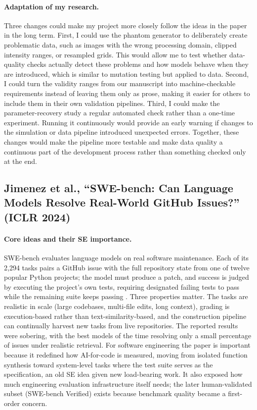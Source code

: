 \documentclass[11pt,a4paper]{article}
\begin{document}
\paragraph{Adaptation of my research.}
Three changes could make my project more closely follow the ideas in the paper in the long term. First, I could use the phantom generator to deliberately create problematic data, such as images with the wrong processing domain, clipped intensity ranges, or resampled grids. This would allow me to test whether data-quality checks actually detect these problems and how models behave when they are introduced, which is similar to mutation testing but applied to data. Second, I could turn the validity ranges from our manuscript into machine-checkable requirements instead of leaving them only as prose, making it easier for others to include them in their own validation pipelines. Third, I could make the parameter-recovery study a regular automated check rather than a one-time experiment. Running it continuously would provide an early warning if changes to the simulation or data pipeline introduced unexpected errors. Together, these changes would make the pipeline more testable and make data quality a continuous part of the development process rather than something checked only at the end.

\subsection{Jimenez et al., ``SWE-bench: Can Language Models Resolve Real-World GitHub Issues?'' (ICLR 2024)}

\paragraph{Core ideas and their SE importance.}
SWE-bench evaluates language models on real software maintenance. Each of its 2{,}294 tasks pairs a GitHub issue with the full repository state from one of twelve popular Python projects; the model must produce a patch, and success is judged by executing the project's own tests, requiring designated failing tests to pass while the remaining suite keeps passing \cite{jimenez}. Three properties matter. The tasks are realistic in scale (large codebases, multi-file edits, long context), grading is execution-based rather than text-similarity-based, and the construction pipeline can continually harvest new tasks from live repositories. The reported results were sobering, with the best models of the time resolving only a small percentage of issues under realistic retrieval. For software engineering the paper is important because it redefined how AI-for-code is measured, moving from isolated function synthesis toward system-level tasks where the test suite serves as the specification, an old SE idea given new load-bearing work. It also exposed how much engineering evaluation infrastructure itself needs; the later human-validated subset (SWE-bench Verified) exists because benchmark quality became a first-order concern.
\end{document}
